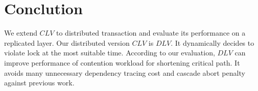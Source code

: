 \documentclass[conference]{IEEEtran}
\begin{document}
\section{Conclution}
\label{sec:conclution}
We extend $CLV$ to distributed transaction and evaluate its performance  on a replicated layer.
Our distributed version ${CLV}$ is ${DLV}$.
It dynamically decides to violate lock at the most suitable time.
According to our evaluation, ${DLV}$ can improve performance of contention workload for shortening critical path.
It avoids many unnecessary dependency tracing cost and cascade abort penalty against previous work.







\end{document}
